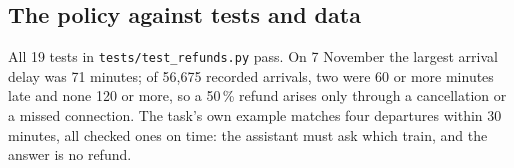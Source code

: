 
\subsection{The policy against tests and data}
\label{sec:datacheck}

All 19 tests in \texttt{tests/test\_refunds.py} pass. On 7 November the largest arrival delay was 71 minutes; of 56,675 recorded arrivals, two were 60 or more minutes late and none 120 or more, so a 50\,\% refund arises only through a cancellation or a missed connection. The task's own example matches four departures within 30 minutes, all checked ones on time: the assistant must ask which train, and the answer is no refund.
